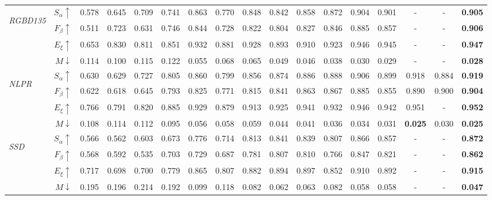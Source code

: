 \documentclass[runningheads]{llncs}
\begin{document}
\begin{table}[pt]
{\begin{tabular}{lr|ccccc|ccccccccc|c}
			\multirow{4}{*}{\begin{sideways}\textit{RGBD135}\end{sideways}}
			& $S_{\alpha}\uparrow$ &0.578& 0.645 & 0.709 & 0.741 & 0.863 & 0.770 & 0.848 & 0.842  & 0.858 & 0.872 & 0.904 &0.901 &-&-& {\bf 0.905} \\
			& $F_{\beta}\uparrow$  &0.511& 0.723  & 0.631 & 0.746 & 0.844 & 0.728 & 0.822  & 0.804   & 0.827 & 0.846 & 0.885 &0.857 &-&-& {\bf 0.906} \\
			& $E_{\xi}\uparrow$ &0.653& 0.830 & 0.811 & 0.851 & 0.932 & 0.881 & 0.928  & 0.893   & 0.910 & 0.923 & 0.946 &0.945 &-&-& {\bf 0.947} \\
			& $M\downarrow$ &0.114& 0.100 & 0.115 & 0.122 & 0.055 & 0.068 & 0.065 & 0.049  & 0.046 & 0.038 & 0.030 &0.029 &-&-& {\bf 0.028} \\
			\midrule
			
			\multirow{4}{*}{\begin{sideways}\textit{NLPR}\end{sideways}}
			& $S_{\alpha}\uparrow$ &0.630& 0.629 & 0.727 & 0.805 & 0.860 & 0.799 & 0.856  & 0.874  & 0.886 & 0.888 & 0.906 &0.899 &0.918&0.884& {\bf 0.919} \\
			& $F_{\beta}\uparrow$  &0.622& 0.618 & 0.645 & 0.793 & 0.825 & 0.771 & 0.815  & 0.841  & 0.863 & 0.867 & 0.885 &0.855 &0.890&0.900& {\bf 0.904} \\
			& $E_{\xi}\uparrow$ &0.766& 0.791 & 0.820 & 0.885 & 0.929 & 0.879 & 0.913  & 0.925  & 0.941 & 0.932 & 0.946 &0.942 &0.951&-& {\bf 0.952} \\
			& $M\downarrow$ &0.108& 0.114 & 0.112 & 0.095 & 0.056 & 0.058 & 0.059  & 0.044  & 0.041 & 0.036 & 0.034 &0.031 &{\bf 0.025}&0.030& {\bf 0.025} \\
			\midrule
			
			\multirow{4}{*}{\begin{sideways}\textit{SSD}\end{sideways}}
			& $S_{\alpha}\uparrow$ &0.566& 0.562 & 0.603 & 0.673 & 0.776 & 0.714 & 0.813 & 0.841 & 0.839 & 0.807 & 0.866 &0.857 &-&-& {\bf 0.872} \\
			& $F_{\beta}\uparrow$ &0.568& 0.592 & 0.535 & 0.703 & 0.729 & 0.687 & 0.781 & 0.807 & 0.810 & 0.766 & 0.847 &0.821 &-&-& {\bf 0.862} \\
			& $E_{\xi}\uparrow$  &0.717& 0.698 & 0.700 & 0.779 & 0.865 & 0.807 & 0.882  & 0.894   & 0.897 & 0.852 & 0.910 &0.892 &-&-& {\bf 0.915} \\
			& $M\downarrow$ &0.195& 0.196 & 0.214 & 0.192 & 0.099 & 0.118 & 0.082  & 0.062   & 0.063 & 0.082 & 0.058 &0.058 &-&-& {\bf 0.047} \\
			\midrule
			

\end{tabular}}
\end{table}
\end{document}
